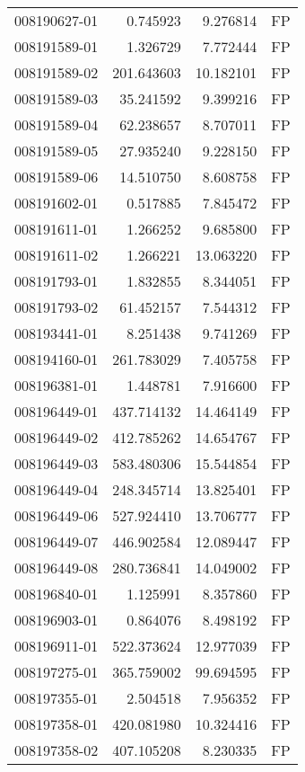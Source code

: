 \begin{tabular}{lrrl}
008190627-01 &    0.745923 &     9.276814 &   FP \\
008191589-01 &    1.326729 &     7.772444 &   FP \\
008191589-02 &  201.643603 &    10.182101 &   FP \\
008191589-03 &   35.241592 &     9.399216 &   FP \\
008191589-04 &   62.238657 &     8.707011 &   FP \\
008191589-05 &   27.935240 &     9.228150 &   FP \\
008191589-06 &   14.510750 &     8.608758 &   FP \\
008191602-01 &    0.517885 &     7.845472 &   FP \\
008191611-01 &    1.266252 &     9.685800 &   FP \\
008191611-02 &    1.266221 &    13.063220 &   FP \\
008191793-01 &    1.832855 &     8.344051 &   FP \\
008191793-02 &   61.452157 &     7.544312 &   FP \\
008193441-01 &    8.251438 &     9.741269 &   FP \\
008194160-01 &  261.783029 &     7.405758 &   FP \\
008196381-01 &    1.448781 &     7.916600 &   FP \\
008196449-01 &  437.714132 &    14.464149 &   FP \\
008196449-02 &  412.785262 &    14.654767 &   FP \\
008196449-03 &  583.480306 &    15.544854 &   FP \\
008196449-04 &  248.345714 &    13.825401 &   FP \\
008196449-06 &  527.924410 &    13.706777 &   FP \\
008196449-07 &  446.902584 &    12.089447 &   FP \\
008196449-08 &  280.736841 &    14.049002 &   FP \\
008196840-01 &    1.125991 &     8.357860 &   FP \\
008196903-01 &    0.864076 &     8.498192 &   FP \\
008196911-01 &  522.373624 &    12.977039 &   FP \\
008197275-01 &  365.759002 &    99.694595 &   FP \\
008197355-01 &    2.504518 &     7.956352 &   FP \\
008197358-01 &  420.081980 &    10.324416 &   FP \\
008197358-02 &  407.105208 &     8.230335 &   FP \\

\end{tabular}
